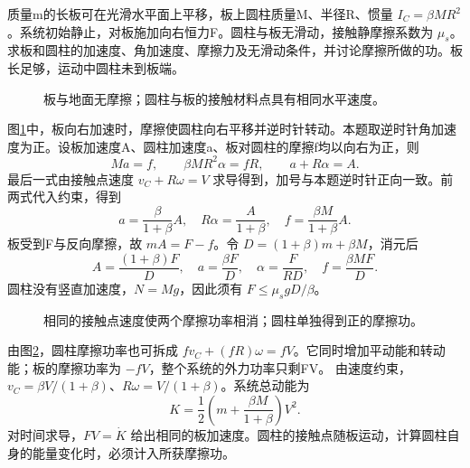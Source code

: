 \begin{example}[圆柱在被拉动的板上滚动]\label{sup6:problem-example-7}\label{sup6:ex:d5-e7}
质量m的长板可在光滑水平面上平移，板上圆柱质量M、半径R、惯量 $I_C=\beta MR^2$。系统初始静止，对板施加向右恒力F。圆柱与板无滑动，接触静摩擦系数为 $\mu_s$。求板和圆柱的加速度、角加速度、摩擦力及无滑动条件，并讨论摩擦所做的功。板长足够，运动中圆柱未到板端。
\end{example}
\begin{figure}[H]\centering
{}
\caption{板与地面无摩擦；圆柱与板的接触材料点具有相同水平速度。}\label{sup6:fig:d5-e7-q}
\end{figure}
\begin{solution}
图\ref{sup6:fig:d5-e7-q}中，板向右加速时，摩擦使圆柱向右平移并逆时针转动。本题取逆时针角加速度为正。设板加速度A、圆柱加速度a、板对圆柱的摩擦f均以向右为正，则
\[
Ma=f,\qquad \beta MR^2\alpha=fR,\qquad
a+R\alpha=A.
\]
最后一式由接触点速度 $v_C+R\omega=V$ 求导得到，加号与本题逆时针正向一致。前两式代入约束，得到
\[
a=\frac{\beta}{1+\beta}A,\quad
R\alpha=\frac{A}{1+\beta},\quad
f=\frac{\beta M}{1+\beta}A.
\]
板受到F与反向摩擦，故 $mA=F-f$。令 $D=(1+\beta)m+\beta M$，消元后
\[
\boxed{A=\frac{(1+\beta)F}D,\quad
a=\frac{\beta F}D,\quad
\alpha=\frac F{RD},\quad f=\frac{\beta MF}D.}
\]
圆柱没有竖直加速度，$N=Mg$，因此须有 $F\le\mu_sgD/\beta$。
\begin{figure}[H]\centering
{}
\caption{相同的接触点速度使两个摩擦功率相消；圆柱单独得到正的摩擦功。}\label{sup6:fig:d5-e7-s}
\end{figure}
由图\ref{sup6:fig:d5-e7-s}，圆柱摩擦功率也可拆成 $fv_C+(fR)\omega=fV$。它同时增加平动能和转动能；板的摩擦功率为 $-fV$，整个系统的外力功率只剩FV。
由速度约束，$v_C=\beta V/(1+\beta)$、$R\omega=V/(1+\beta)$。系统总动能为
\[
K=\frac12\left(m+\frac{\beta M}{1+\beta}\right)V^2.
\]
对时间求导，$FV=\dot K$ 给出相同的板加速度。圆柱的接触点随板运动，计算圆柱自身的能量变化时，必须计入所获摩擦功。
\end{solution}



